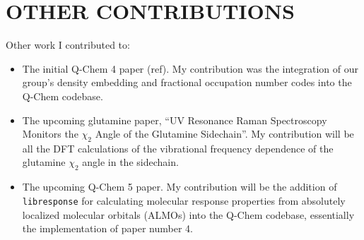 \chapter{OTHER CONTRIBUTIONS}

Other work I contributed to:

\begin{itemize}
\item The initial Q-Chem 4 paper (ref). My contribution was the integration of our group's density embedding and fractional occupation number codes into the Q-Chem codebase.
\item The upcoming glutamine paper, ``UV Resonance Raman Spectroscopy Monitors the \(\chi_2\) Angle of the Glutamine Sidechain''. My contribution will be all the DFT calculations of the vibrational frequency dependence of the glutamine \(\chi_2\) angle in the sidechain.
\item The upcoming Q-Chem 5 paper. My contribution will be the addition of \texttt{libresponse} for calculating molecular response properties from absolutely localized molecular orbitals (ALMOs) into the Q-Chem codebase, essentially the implementation of paper number 4.
\end{itemize}
